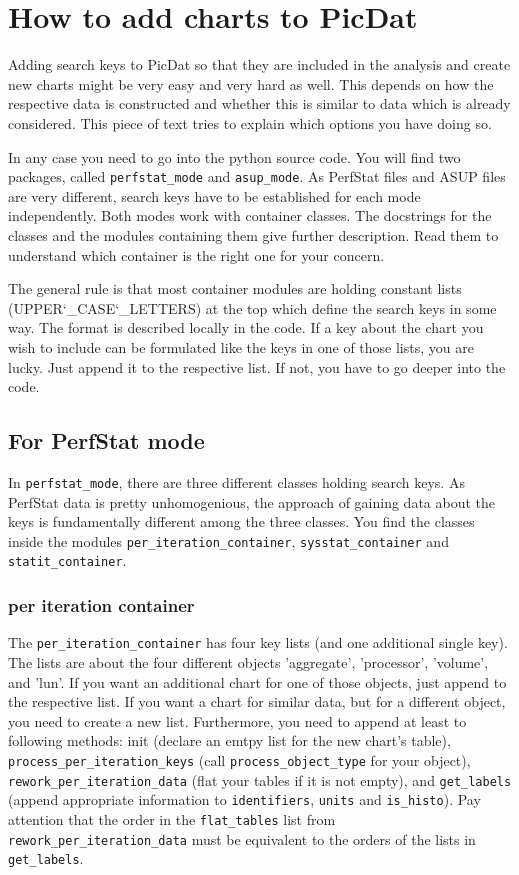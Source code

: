 \documentclass[a4paper,11pt]{article}
\begin{document}
\section*{How to add charts to PicDat}

Adding search keys to PicDat so that they are included in the analysis and create new charts might be very easy and very hard as well. This depends on how the respective data is constructed and whether this is similar to data which is already considered. This piece of text tries to explain which options you have doing so.
\bigskip

In any case you need to go into the python source code. You will find two packages, called \verb|perfstat_mode| and \verb|asup_mode|. As PerfStat files and ASUP files are very different, search keys have to be established for each mode independently. Both modes work with container classes. The docstrings for the classes and the modules containing them give further description. Read them to understand which container is the right one for your concern.
\bigskip

The general rule is that most container modules are holding constant lists (UPPER\char`_CASE\char`_\break LETTERS) at the top which define the search keys in some way. The format is described locally in the code. If a key about the chart you wish to include can be formulated like the keys in one of those lists, you are lucky. Just append it to the respective list. If not, you have to go deeper into the code.

\subsection*{For PerfStat mode}
In \verb|perfstat_mode|, there are three different classes holding search keys. As PerfStat data is pretty unhomogenious, the approach of gaining data about the keys is fundamentally different among the three classes. You find the classes inside the modules \verb|per_iteration_container|, \verb|sysstat_container| and \verb|statit_container|.

\subsubsection*{per iteration container}
The \verb|per_iteration_container| has four key lists (and one additional single key). The lists are about the four different objects 'aggregate', 'processor', 'volume', and 'lun'. If you want an additional chart for one of those objects, just append to the respective list. If you want a chart for similar data, but for a different object, you need to create a new list. Furthermore, you need to append at least to following methods: init (declare an emtpy list for the new chart's table), \verb|process_per_iteration_keys| (call \verb|process_object_type| for your object), \verb|rework_per_iteration_data| (flat your tables if it is not empty), and \verb|get_labels| (append appropriate information to \verb|identifiers|, \verb|units| and \verb|is_histo|). Pay attention that the order in the \verb|flat_tables| list from \verb|rework_per_iteration_data| must be equivalent to the orders of the lists in \verb|get_labels|.
\end{document}
